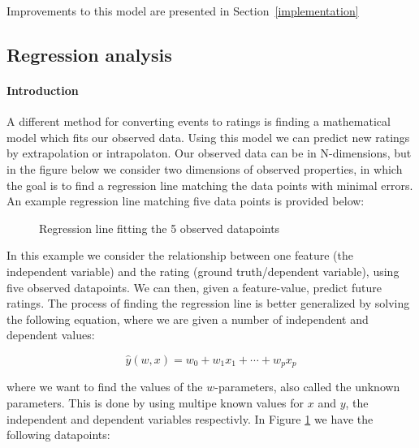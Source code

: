 Improvements to this model are presented in Section~\ref{implementation}

\subsection{Regression analysis}

\paragraph{Introduction}
A different method for converting events to ratings is finding a mathematical
model which fits our observed data. Using this model we can predict new ratings
by extrapolation or intrapolaton. Our observed data can be in N-dimensions, but
in the figure below we consider two dimensions of observed properties, in which
the goal is to find a regression line matching the data points with minimal
errors. An example regression line matching five data points is provided below:

\begin{figure}[H]
  \centering
  \label{fig-regression}
  \caption{Regression line fitting the 5 observed datapoints}
\end{figure}

In this example we consider the relationship between one feature (the
independent variable) and the rating (ground truth/dependent variable), using
five observed datapoints. We can then, given a feature-value, predict future
ratings. The process of finding the regression line is better generalized by
solving the following equation, where we are given a number of independent and
dependent values:

\begin{equation}
  \label{eq-regression}
  \hat{y}(w,x) = w_0 + w_1 x_1 + \cdots + w_p x_p
\end{equation}

where we want to find the values of the $w$-parameters, also called the unknown
parameters. This is done by using multipe known values for $x$ and $y$, the
independent and dependent variables respectivly. In Figure \ref{fig-regression}
we have the following datapoints:

